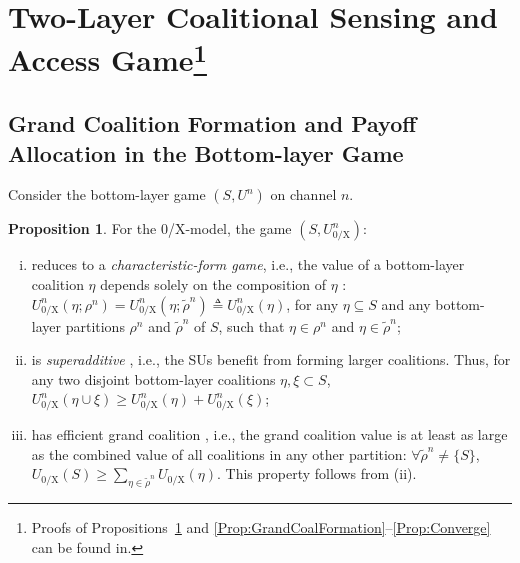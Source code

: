 \documentclass[journal,draftclsnofoot,onecolumn]{IEEEtran}
\theoremstyle{definition}
\newtheorem{Prop}{Proposition}
\begin{document}
\section[Two-Layer Coalitional Sensing and Access Game]{Two-Layer Coalitional Sensing and Access Game\footnote{Proofs of Propositions~\ref{Prop:Characteristic} and \ref{Prop:GrandCoalFormation}--\ref{Prop:Converge} can be found in\cite{YLuCISS}.}}\label{Sec:Game}

\subsection{Grand Coalition Formation and Payoff Allocation in the Bottom-layer Game}\label{SubSec:BottomSol}
Consider the bottom-layer game $(S,U^n)$ on channel $n$.

\begin{Prop}\label{Prop:Characteristic}
For the 0/X-model, the game $(S,U_\mathrm{0/X}^n)$: 
\begin{enumerate}[(i)]
	\item reduces to a \emph{characteristic-form game}, i.e., the value of a bottom-layer coalition $\eta$ depends solely on the composition of $\eta$ \cite{CoalGameSurvey}: $U_\mathrm{0/X}^n(\eta;\rho^n)=U_\mathrm{0/X}^n(\eta;\tilde\rho^n)\triangleq U_\mathrm{0/X}^n(\eta)$, for any $\eta \subseteq S$ and any bottom-layer partitions $\rho^n$ and $\tilde\rho^n$ of $S$, such that $\eta \in \rho^n$  and  $\eta \in \tilde\rho^n$; 

\item is \emph{superadditive} \cite{CoalGameSurvey}, i.e., the SUs benefit from forming larger coalitions. Thus, for any two disjoint bottom-layer coalitions $\eta,\xi \subset S$, $U_\mathrm{0/X}^n(\eta \cup \xi)\geq U_\mathrm{0/X}^n(\eta)+U_\mathrm{0/X}^n(\xi)$; 

\item has efficient grand coalition \cite{Efficiency}, i.e., the grand coalition value is at least as large as the combined value of all coalitions in any other partition: $\forall\tilde\rho^n\neq\{S\}$, $U_\mathrm{0/X}(S)\geq \sum_{\eta\in\tilde\rho^n} U_\mathrm{0/X}(\eta)$. This property follows from (ii).
\end{enumerate}
\end{Prop}
\end{document}
